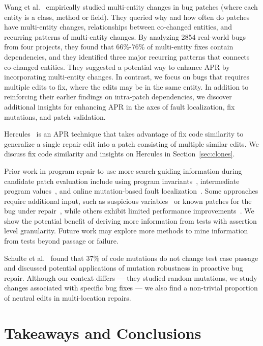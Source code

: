 \documentclass[10pt, conference]{IEEEtran}
\begin{document}
Wang et al.~\cite{wang2018} empirically studied multi-entity changes in bug patches 
(where each entity is a class, method or field). They queried
why and how often do patches have multi-entity changes, relationships 
between co-changed entities, and recurring patterns of multi-entity changes. 
By analyzing 2854 real-world bugs from four projects, they found that 66\%-76\% of
multi-entity fixes contain dependencies, 
and they identified three major recurring patterns that connects co-changed entities. 
They suggested a potential way to 
enhance APR by incorporating multi-entity changes. In contrast, we focus on bugs that
requires multiple edits to fix, where the edits may be in the same entity. In addition 
to reinforcing their earlier findings on intra-patch dependencies, we discover 
additional insights for enhancing APR in the axes of fault localization, 
fix mutations, and patch validation.

Hercules~\cite{saha2019harnessing} is an APR technique that takes 
advantage of fix code similarity to generalize a single repair edit into a 
patch consisting of multiple similar edits.
We discuss fix code similarity and insights on Hercules in 
Section~\ref{sec:clones}.

Prior work in program repair to use more search-guiding information 
during candidate patch evaluation 
include using program invariants~\cite{better-fitness, dinglyu}, 
intermediate program values~\cite{source-code-checkpoint}, 
and online mutation-based fault localization~\cite{mut-analysis}.
Some approaches require additional input, such as suspicious variables~\cite{source-code-checkpoint} 
or known patches for the bug under repair~\cite{better-fitness}, 
while others exhibit limited performance improvements~\cite{dinglyu, mut-analysis}.
We show the potential benefit of deriving more information from tests
with assertion level granularity.
Future work may explore more methods to mine information from tests 
beyond passage or failure.

Schulte et al.~\cite{schulte} found that 37\% of code mutations 
do not change test case passage and discussed potential applications 
of mutation robustness in proactive bug repair. 
Although our context differs --- they studied random mutations, 
we study changes associated with specific bug fixes --- we also find a 
non-trivial proportion of neutral edits in multi-location repairs.


\section{Takeaways and Conclusions}
\label{sec:takeaways}
\end{document}
